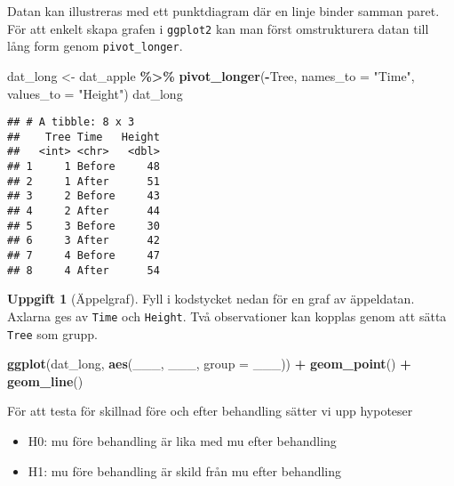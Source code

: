 \documentclass[
]{book}
\newenvironment{Shaded}{\begin{snugshade}}{\end{snugshade}}
\newcommand{\AttributeTok}[1]{\textcolor[rgb]{0.13,0.29,0.53}{#1}}
\newcommand{\FunctionTok}[1]{\textcolor[rgb]{0.13,0.29,0.53}{\textbf{#1}}}
\newcommand{\NormalTok}[1]{#1}
\newcommand{\OtherTok}[1]{\textcolor[rgb]{0.56,0.35,0.01}{#1}}
\newcommand{\SpecialCharTok}[1]{\textcolor[rgb]{0.81,0.36,0.00}{\textbf{#1}}}
\newcommand{\StringTok}[1]{\textcolor[rgb]{0.31,0.60,0.02}{#1}}
\providecommand{\tightlist}{%
  \setlength{\itemsep}{0pt}\setlength{\parskip}{0pt}}
\theoremstyle{definition}
\theoremstyle{definition}
\theoremstyle{definition}
\newtheorem{exercise}{Uppgift}[chapter]
\theoremstyle{definition}
\theoremstyle{remark}
\begin{document}
Datan kan illustreras med ett punktdiagram där en linje binder samman paret. För att enkelt skapa grafen i \texttt{ggplot2} kan man först omstrukturera datan till lång form genom \texttt{pivot\_longer}.

\begin{Shaded}
\begin{Highlighting}[]
\NormalTok{dat\_long }\OtherTok{\textless{}{-}}\NormalTok{ dat\_apple }\SpecialCharTok{\%\textgreater{}\%} \FunctionTok{pivot\_longer}\NormalTok{(}\SpecialCharTok{{-}}\NormalTok{Tree, }\AttributeTok{names\_to =} \StringTok{"Time"}\NormalTok{, }\AttributeTok{values\_to =} \StringTok{"Height"}\NormalTok{)}
\NormalTok{dat\_long}
\end{Highlighting}
\end{Shaded}

\begin{verbatim}
## # A tibble: 8 x 3
##    Tree Time   Height
##   <int> <chr>   <dbl>
## 1     1 Before     48
## 2     1 After      51
## 3     2 Before     43
## 4     2 After      44
## 5     3 Before     30
## 6     3 After      42
## 7     4 Before     47
## 8     4 After      54
\end{verbatim}

\begin{exercise}[Äppelgraf]

Fyll i kodstycket nedan för en graf av äppeldatan. Axlarna ges av \texttt{Time} och \texttt{Height}. Två observationer kan kopplas genom att sätta \texttt{Tree} som grupp.

\begin{Shaded}
\begin{Highlighting}[]
\FunctionTok{ggplot}\NormalTok{(dat\_long, }\FunctionTok{aes}\NormalTok{(\_\_\_, \_\_\_, }\AttributeTok{group =}\NormalTok{ \_\_\_)) }\SpecialCharTok{+}
  \FunctionTok{geom\_point}\NormalTok{() }\SpecialCharTok{+}
  \FunctionTok{geom\_line}\NormalTok{()}
\end{Highlighting}
\end{Shaded}

\end{exercise}

För att testa för skillnad före och efter behandling sätter vi upp hypoteser

\begin{itemize}
\tightlist
\item
  H0: mu före behandling är lika med mu efter behandling
\item
  H1: mu före behandling är skild från mu efter behandling
\end{itemize}
\end{document}

